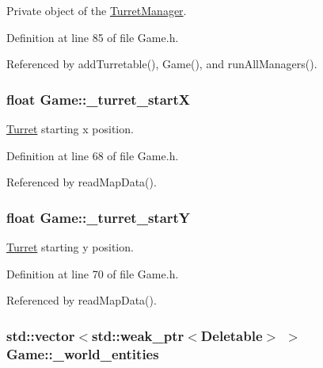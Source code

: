 Private object of the \hyperlink{classTurretManager}{Turret\-Manager}. 



Definition at line 85 of file Game.\-h.



Referenced by add\-Turretable(), Game(), and run\-All\-Managers().

\hypertarget{classGame_ad7a148e2de0c944863d8aaa78a075f74}{
\subsubsection[{\-\_\-turret\-\_\-start\-X}]{\setlength{\rightskip}{0pt plus 5cm}float Game\-::\-\_\-turret\-\_\-start\-X\hspace{0.3cm}{\ttfamily [private]}}}\label{classGame_ad7a148e2de0c944863d8aaa78a075f74}


\hyperlink{classTurret}{Turret} starting x position. 



Definition at line 68 of file Game.\-h.



Referenced by read\-Map\-Data().

\hypertarget{classGame_ab875384f85be491849e480d7f91cfe93}{
\subsubsection[{\-\_\-turret\-\_\-start\-Y}]{\setlength{\rightskip}{0pt plus 5cm}float Game\-::\-\_\-turret\-\_\-start\-Y\hspace{0.3cm}{\ttfamily [private]}}}\label{classGame_ab875384f85be491849e480d7f91cfe93}


\hyperlink{classTurret}{Turret} starting y position. 



Definition at line 70 of file Game.\-h.



Referenced by read\-Map\-Data().

\hypertarget{classGame_acedcdfef5913013956cd6454e022afc1}{
\subsubsection[{\-\_\-world\-\_\-entities}]{\setlength{\rightskip}{0pt plus 5cm}std\-::vector$<$std\-::weak\-\_\-ptr$<${\bf Deletable}$>$ $>$ Game\-::\-\_\-world\-\_\-entities\hspace{0.3cm}{\ttfamily [private]}}}\label{classGame_acedcdfef5913013956cd6454e022afc1}


